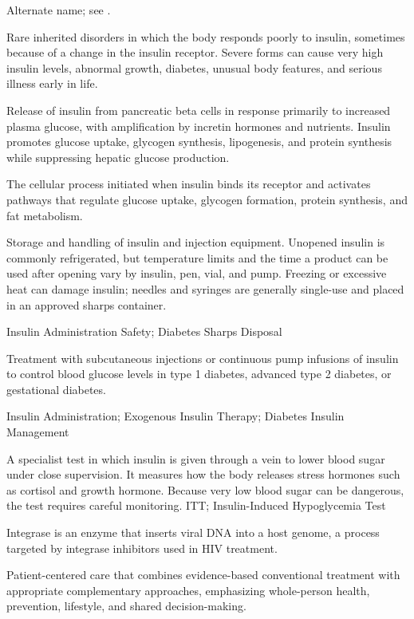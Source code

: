  Alternate name; see .

 Rare inherited disorders in which the body responds poorly to insulin, sometimes because of a change in the insulin receptor. Severe forms can cause very high insulin levels, abnormal growth, diabetes, unusual body features, and serious illness early in life.

 Release of insulin from pancreatic beta cells in response primarily to increased plasma
glucose, with amplification by incretin hormones and nutrients. Insulin promotes glucose
uptake, glycogen synthesis, lipogenesis, and protein synthesis while suppressing hepatic
glucose production.

 The cellular process initiated when insulin binds its receptor and activates pathways that regulate glucose uptake, glycogen formation, protein synthesis, and fat metabolism.

 Storage and handling of insulin and injection equipment. Unopened insulin is commonly refrigerated, but temperature limits and the time a product can be used after opening vary by insulin, pen, vial, and pump. Freezing or excessive heat can damage insulin; needles and syringes are generally single-use and placed in an approved sharps container.

\synonyms
Insulin Administration Safety; Diabetes Sharps Disposal

 Treatment with subcutaneous injections or continuous pump infusions of insulin to control blood glucose levels in type 1 diabetes, advanced type 2 diabetes, or gestational diabetes.

\synonyms
Insulin Administration; Exogenous Insulin Therapy; Diabetes Insulin Management

 A specialist test in which insulin is given through a vein to lower blood sugar under close supervision. It measures how the body releases stress hormones such as cortisol and growth hormone. Because very low blood sugar can be dangerous, the test requires careful monitoring.
\synonyms
ITT; Insulin-Induced Hypoglycemia Test

 Integrase is an enzyme that inserts viral DNA into a host genome, a process targeted by integrase inhibitors used in HIV treatment.

 Patient-centered care that combines evidence-based conventional treatment with appropriate complementary approaches, emphasizing whole-person health, prevention, lifestyle, and shared decision-making.

